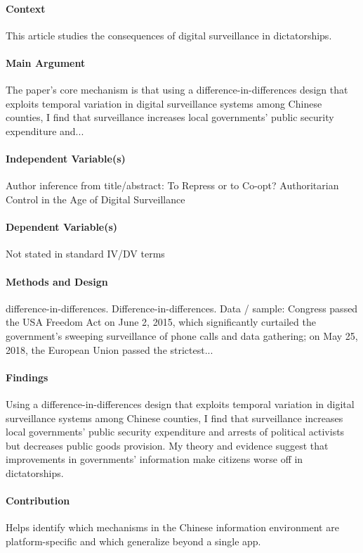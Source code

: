 \documentclass[12pt]{article}
\begin{document}
\paragraph{Context} This article studies the consequences of digital surveillance in dictatorships.

\paragraph{Main Argument} The paper's core mechanism is that using a difference-in-differences design that exploits temporal variation in digital surveillance systems among Chinese counties, I find that surveillance increases local governments' public security expenditure and...

\paragraph{Independent Variable(s)} Author inference from title/abstract: To Repress or to Co-opt? Authoritarian Control in the Age of Digital Surveillance

\paragraph{Dependent Variable(s)} Not stated in standard IV/DV terms

\paragraph{Methods and Design} difference-in-differences. Difference-in-differences. Data / sample: Congress passed the USA Freedom Act on June 2, 2015, which significantly curtailed the government's sweeping surveillance of phone calls and data gathering; on May 25, 2018, the European Union passed the strictest...

\paragraph{Findings} Using a difference-in-differences design that exploits temporal variation in digital surveillance systems among Chinese counties, I find that surveillance increases local governments' public security expenditure and arrests of political activists but decreases public goods provision. My theory and evidence suggest that improvements in governments' information make citizens worse off in dictatorships.

\paragraph{Contribution} Helps identify which mechanisms in the Chinese information environment are platform-specific and which generalize beyond a single app.
\end{document}
